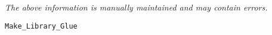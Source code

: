 \label{pkg:make\_library\_glue}

{\tiny \it The above information is manually maintained and may contain errors.}
\begin{verbatim}
Make_Library_Glue
\end{verbatim}
